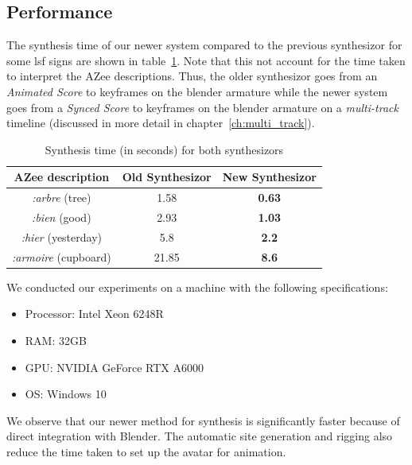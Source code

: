 \documentclass[../../main.tex]{subfiles}
\begin{document}
\subsection{Performance}
\label{ch:avatar_creation_pose_synthesis:evaluation:performance}

The synthesis time of our newer system compared to the previous synthesizor for some \gls{lsf} signs are shown in table~\ref{tab:faster_executions}. Note that this not account for the time taken to interpret the AZee descriptions. Thus, the older synthesizor goes from an \emph{Animated Score} to keyframes on the blender armature while the newer system goes from a \emph{Synced Score} to keyframes on the blender armature on a \emph{multi-track} timeline (discussed in more detail in chapter~\ref{ch:multi_track}).

\begin{table}
    \centering
    \begin{tabular}{|c|c|c|}
        \hline
        \textbf{AZee description} & \textbf{Old Synthesizor} & \textbf{New Synthesizor}\\
        \hline
        \emph{:arbre} (tree) & 1.58 & \textbf{0.63} \\
        \emph{:bien} (good) & 2.93 & \textbf{1.03} \\
        \emph{:hier} (yesterday) & 5.8 & \textbf{2.2} \\
        \emph{:armoire} (cupboard) & 21.85 & \textbf{8.6} \\
        \hline
    \end{tabular}
    \caption{Synthesis time (in seconds) for both synthesizors}
    \label{tab:faster_executions}
\end{table}

We conducted our experiments on a machine with the following specifications:
\begin{itemize}
    \item Processor: Intel Xeon 6248R
    \item RAM: 32GB
    \item GPU: NVIDIA GeForce RTX A6000
    \item OS: Windows 10
\end{itemize}

We observe that our newer method for synthesis is significantly faster because of direct integration with Blender. The automatic site generation and rigging also reduce the time taken to set up the avatar for animation.

\end{document}
